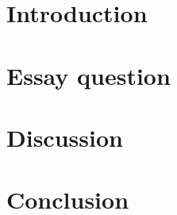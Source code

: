 \documentclass{article}
\begin{document}


\section{Introduction}
    

\section{Essay question}
    

\section{Discussion}
    

\section{Conclusion}
    

\nocite{*}
\printbibliography
\end{document}
